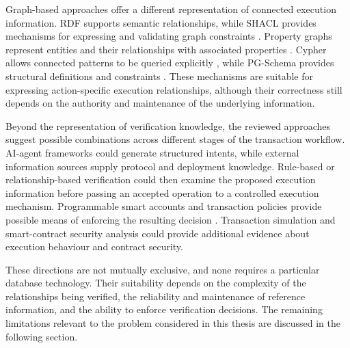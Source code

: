 Graph-based approaches offer a different representation
of connected execution information. RDF supports semantic
relationships, while SHACL provides mechanisms for expressing
and validating graph constraints \cite{w3cSHACL2017}.
Property graphs represent entities and their relationships
with associated properties \cite{anglesPropertyGraphModel2018}.
Cypher allows connected patterns to be queried explicitly
\cite{francisCypher2018}, while PG-Schema provides structural
definitions and constraints \cite{anglesPGSchema2023}.
These mechanisms are suitable for expressing action-specific
execution relationships, although their correctness still
depends on the authority and maintenance of the underlying
information.

Beyond the representation of verification knowledge, the
reviewed approaches suggest possible combinations across
different stages of the transaction workflow. AI-agent
frameworks could generate structured intents, while external
information sources supply protocol and deployment knowledge.
Rule-based or relationship-based verification could then
examine the proposed execution information before passing
an accepted operation to a controlled execution mechanism.
Programmable smart accounts and transaction policies provide
possible means of enforcing the resulting decision
\cite{coinbaseAgentKit2026,
buterinERC4337AccountAbstraction2021,
safeSmartAccountGuards2026}. Transaction simulation and
smart-contract security analysis could provide additional
evidence about execution behaviour and contract security.

These directions are not mutually exclusive, and none
requires a particular database technology. Their suitability
depends on the complexity of the relationships being verified,
the reliability and maintenance of reference information,
and the ability to enforce verification decisions. The
remaining limitations relevant to the problem considered
in this thesis are discussed in the following section.




